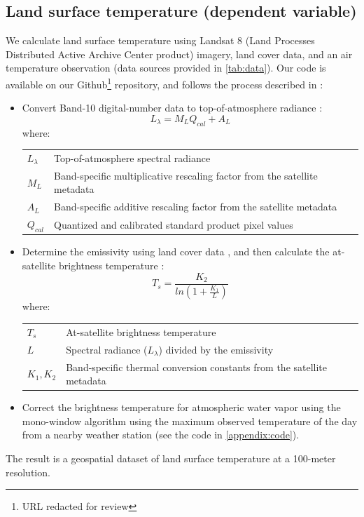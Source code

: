 \documentclass[final,3p,times,onecolumn,sort&compress]{elsarticle}
\makeatletter
\newenvironment{conditions}
  {\par\vspace{\abovedisplayskip}\noindent\begin{tabular}{>{$}l<{$} @{${}={}$} l}}
  {\end{tabular}\par\vspace{\belowdisplayskip}}
\makeatother
\begin{document}
\subsection{Land surface temperature (dependent variable)}
We calculate land surface temperature using Landsat 8 (Land Processes Distributed Active Archive Center product) imagery, land cover data, and an air temperature observation (data sources provided in \ref{tab:data}). 
Our code is available on our Github\footnote{URL redacted for review} repository, and follows the process described in \cite{Scott2016-lc}:
\begin{itemize}
    \item 
        Convert Band-10 digital-number data to top-of-atmosphere radiance \citep{Jimenez-Munoz2003-wc}: 
        \begin{equation}
        \label{eqn:convert_TOA}
        L_\lambda = M_L Q_{cal} + A_L
        \end{equation}
        where:
        \begin{conditions}
         L_\lambda & Top-of-atmosphere spectral radiance \\
         M_L &  Band-specific multiplicative rescaling factor from the satellite metadata \\   
         A_L &  Band-specific additive rescaling factor from the satellite metadata \\   
         Q_{cal} &  Quantized and calibrated standard product pixel values
        \end{conditions}
    \item Determine the emissivity using land cover data \citep{Alipour2003-ym}, and then calculate the at-satellite brightness temperature \citep{Jimenez-Munoz2003-wc}: 
        \begin{equation}
        \label{eqn:at_sat}
        T_s = \frac{K_2}{ln(1 + \frac{K_1}{L})}
        \end{equation}
        where:
        \begin{conditions}
         T_s & At-satellite brightness temperature \\
         L &  Spectral radiance ($L_\lambda$) divided by the emissivity \\   
         K_1, K_2 & Band-specific thermal conversion constants from the satellite metadata
        \end{conditions}
    \item Correct the brightness temperature for atmospheric water vapor using the mono-window algorithm \citep{Qin2001-jn} using the maximum observed temperature of the day from a nearby weather station (see the code in \ref{appendix:code}).
\end{itemize}
The result is a geospatial dataset of land surface temperature at a 100-meter resolution.
\end{document}
